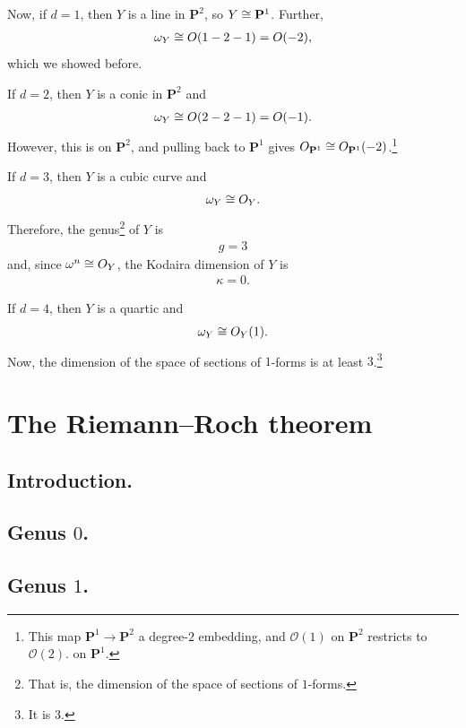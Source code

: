 \documentclass [11 pt, oneside] {article}
\begin{document}
\begin{example}[$n=2$]\label{}\text{}
Now, if $d=1$, then $Y$ is a line in $\mathbf{P}^2$, so $Y\cong \mathbf{P}^1$. Further,
\begin{align*}
	\omega_Y \cong \relax{O}(1-2-1)=  \relax{O}(-2),
\end{align*}
which we showed before. 

If $d=2$, then $Y$ is a conic in $\mathbf{P}^2$ and 
\begin{align*}
	\omega_Y \cong \relax{O}(2-2-1) =  \relax{O}(-1).
\end{align*}
However, this is on $\mathbf{P}^2$, and pulling back to $\mathbf{P}^1$ gives $\relax{O}_{\mathbf{P}^1} \cong \relax{O}_{\mathbf{P}^1}(-2)$.\footnote{This map $\mathbf{P}^1\longrightarrow \mathbf{P}^2$ a degree-$2$ embedding, and $\mathscr{O}(1)$ on $\mathbf{P}^2$ restricts to $\mathscr{O}(2)$. on $\mathbf{P}^1$.}

If $d=3$, then $Y$ is a cubic curve and 
\begin{align*}
	\omega_Y \cong \relax{O}_Y.
\end{align*}
Therefore, the genus\footnote{That is, the dimension of the space of sections of $1$-forms.} of $Y$ is
\begin{align*}
	g = 3
\end{align*}
and, since $\omega^n \cong \relax{O}_Y$, the Kodaira dimension of $Y$ is
\begin{align*}
	\kappa = 0.
\end{align*}
\end{example}

If $d=4$, then $Y$ is a quartic and 
\begin{align*}
	\omega_Y \cong \relax{O}_Y(1).
\end{align*}
Now, the dimension of the space of sections of $1$-forms is at least $3$.\footnote{It is $3$.} 
\iffalse
\section{The Riemann--Roch theorem}
\subsection{Introduction.}
\subsection{Genus \texorpdfstring{$0$}{0}.}
\subsection{Genus \texorpdfstring{$1$}{1}.}
\end{document}
